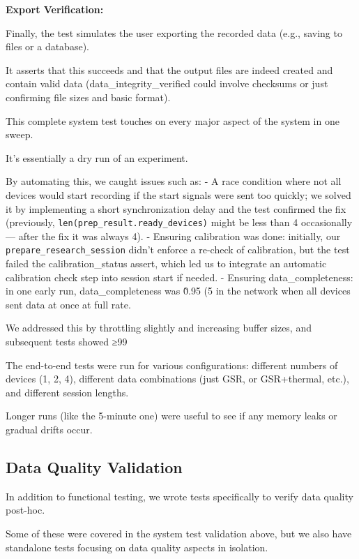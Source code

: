 {{\textbf{Export Verification:}

Finally, the test simulates the user exporting the recorded data (e.g., saving
to files or a database).

It asserts that this succeeds and that the output files are indeed created and
contain valid data (data\_integrity\_verified could involve checksums or just
confirming file sizes and basic format).

This complete system test touches on every major aspect of the system in one
sweep.

It's essentially a dry run of an experiment.

By automating this, we caught issues such as: - A race condition where not all
devices would start recording if the start signals were sent too quickly; we
solved it by implementing a short synchronization delay and the test confirmed
the fix (previously, \texttt{len(prep\_result.ready\_devices)} might be less
than 4 occasionally --- after the fix it was always 4). - Ensuring calibration
was done: initially, our \texttt{prepare\_research\_session} didn't enforce a
re-check of calibration, but the test failed the calibration\_status assert,
which led us to integrate an automatic calibration check step into session start
if needed. - Ensuring data\_completeness: in one early run, data\_completeness
was \~0.95 (5%
in the network when all devices sent data at once at full rate.

We addressed this by throttling slightly and increasing buffer sizes, and
subsequent tests showed ≥99%

The end-to-end tests were run for various configurations: different numbers of
devices (1, 2, 4), different data combinations (just GSR, or GSR+thermal, etc.),
and different session lengths.

Longer runs (like the 5-minute one) were useful to see if any memory leaks or
gradual drifts occur.

\subsection{Data Quality Validation}

In addition to functional testing, we wrote tests specifically to verify data
quality post-hoc.

Some of these were covered in the system test validation above, but we also have
standalone tests focusing on data quality aspects in isolation.

}}

